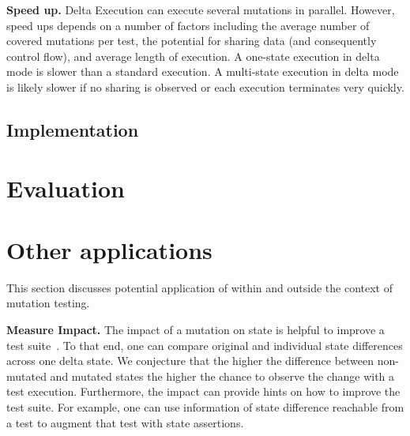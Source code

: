 \documentclass{sig-alternate}
\begin{document}
\noindent\textbf{Speed up.}  Delta Execution can execute several
mutations in parallel.  However, speed ups depends on a number of
factors including the average number of covered mutations per test,
the potential for sharing data (and consequently control flow), and
average length of execution.  A one-state execution in delta mode is
slower than a standard execution.  A multi-state execution in delta
mode is likely slower if no sharing is observed or each execution
terminates very quickly.


\subsection{Implementation}


\section{Evaluation}


\section{Other applications}

This section discusses potential application of \DE{} within and
outside the context of mutation testing.

\vspace{1ex}\noindent\textbf{Measure Impact.}  The impact of a
mutation on state is helpful to improve a test
suite~\cite{schuler-issta-2009}. To that end, one can compare original and
individual state differences across one delta state.  We conjecture
that the higher the difference between non-mutated and mutated states
the higher the chance to observe the change with a test
execution. Furthermore, the impact can
provide hints on how to improve the test suite. For example, one can
use information of state difference reachable from a test to augment
that test with state assertions.  
\end{document}
